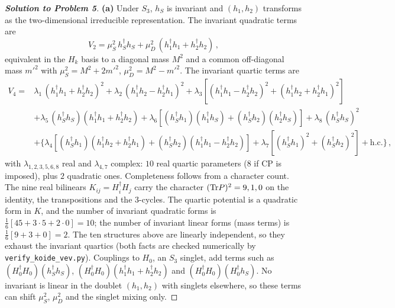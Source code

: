 \documentclass[11pt,a4paper]{article}
\begin{document}
\begin{proof}[\textbf{Solution to Problem 5}]

\textbf{(a)} Under $S_3$, $h_S$ is invariant and $(h_1,h_2)$ transforms
as the two-dimensional irreducible representation.  The invariant
quadratic terms are
\begin{equation*}
  V_2 = \mu_S^2\,h_S^\dagger h_S + \mu_D^2\,(h_1^\dagger h_1 + h_2^\dagger h_2)\,,
\end{equation*}
equivalent in the $H_k$ basis to a diagonal mass $M^2$ and a common
off-diagonal mass $m'^2$ with $\mu_S^2 = M^2 + 2m'^2$,
$\mu_D^2 = M^2 - m'^2$.  The invariant quartic terms are
\begin{align*}
  V_4 ={}& \lambda_1\,(h_1^\dagger h_1 + h_2^\dagger h_2)^2
   + \lambda_2\,(h_1^\dagger h_2 - h_2^\dagger h_1)^2
   + \lambda_3\left[(h_1^\dagger h_1 - h_2^\dagger h_2)^2
     + (h_1^\dagger h_2 + h_2^\dagger h_1)^2\right] \\
  &+ \lambda_5\,(h_S^\dagger h_S)(h_1^\dagger h_1 + h_2^\dagger h_2)
   + \lambda_6\left[(h_S^\dagger h_1)(h_1^\dagger h_S)
     + (h_S^\dagger h_2)(h_2^\dagger h_S)\right]
   + \lambda_8\,(h_S^\dagger h_S)^2 \\
  &+ \Big\{\lambda_4\left[(h_S^\dagger h_1)(h_1^\dagger h_2 + h_2^\dagger h_1)
     + (h_S^\dagger h_2)(h_1^\dagger h_1 - h_2^\dagger h_2)\right]
   + \lambda_7\left[(h_S^\dagger h_1)^2 + (h_S^\dagger h_2)^2\right]
   + \text{h.c.}\Big\}\,,
\end{align*}
with $\lambda_{1,2,3,5,6,8}$ real and $\lambda_{4,7}$ complex: $10$
real quartic parameters ($8$ if CP is imposed), plus $2$ quadratic
ones.  Completeness follows from a character count.  The nine real
bilinears $K_{ij} = H_i^\dagger H_j$ carry the character
$(\mathrm{Tr} P)^2 = 9, 1, 0$ on the identity, the transpositions and the
3-cycles.  The quartic potential is a quadratic form in $K$, and the
number of invariant quadratic forms is
$\tfrac16\left[45 + 3\cdot 5 + 2\cdot 0\right] = 10$; the number of
invariant linear forms (mass terms) is $\tfrac16[9 + 3 + 0] = 2$.
The ten structures above are linearly independent, so they exhaust
the invariant quartics (both facts are checked numerically by
\texttt{verify\_koide\_vev.py}).  Couplings to $H_0$, an $S_3$ singlet, add terms such as
$(H_0^\dagger H_0)(h_S^\dagger h_S)$,
$(H_0^\dagger H_0)(h_1^\dagger h_1 + h_2^\dagger h_2)$ and
$(H_0^\dagger H_0)(H_0^\dagger h_S)$.  No invariant is linear in the
doublet $(h_1,h_2)$ with singlets elsewhere, so these terms can shift
$\mu_S^2$, $\mu_D^2$ and the singlet mixing only.


\end{proof}
\end{document}
